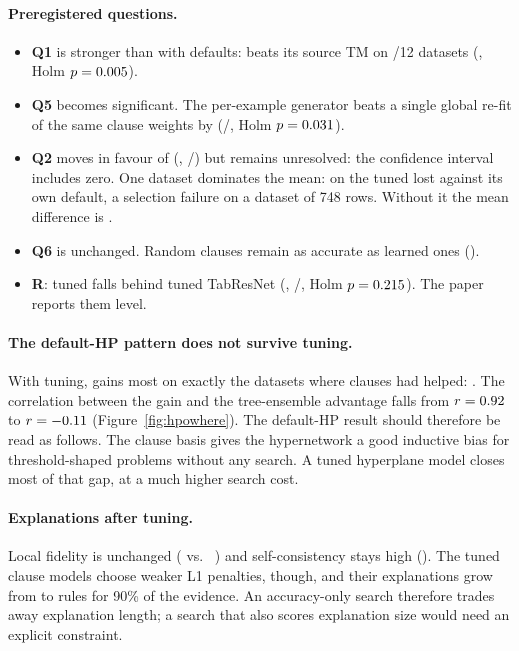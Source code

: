 \paragraph{Preregistered questions.}
\begin{itemize}
  \item \textbf{Q1} is stronger than with defaults:  beats its source TM on
        \HpoimntmtmWins/12 datasets (\HpoimntmtmMean, Holm $p=0.005$).
  \item \textbf{Q5} becomes significant. The per-example generator beats a single global re-fit
        of the same clause weights by \HpoimntmclauselrMean{}
        (\HpoimntmclauselrWins/\HpoimntmclauselrLosses, Holm $p=0.031$).
  \item \textbf{Q2} moves in favour of  (\HpoimntmimnMean,
        \HpoimntmimnWins/\HpoimntmimnLosses) but remains unresolved: the confidence interval
        includes zero. One dataset dominates the mean: on \HpoImntmImnBest{} the tuned \imn{}
        lost \TuneimnWorst{} against its own default, a selection failure on a dataset of
        748 rows. Without it the mean difference is \HpoImntmImnMeanNoBest.
  \item \textbf{Q6} is unchanged. Random clauses remain as accurate as learned ones
        (\HpoimntmimntmrandMean).
  \item \textbf{R}: tuned \imn{} falls behind tuned TabResNet (\HpoimntabresnetMean,
        \HpoimntabresnetWins/\HpoimntabresnetLosses, Holm $p=0.215$). The paper
        reports them level.
\end{itemize}

\paragraph{The default-HP pattern does not survive tuning.} With tuning, \imn{} gains most on
exactly the datasets where clauses had helped: \TuneimnBest. The correlation between the
 gain and the tree-ensemble advantage falls from $r=0.92$ to
$r=-0.11$ (Figure~\ref{fig:hpowhere}). The default-HP result should therefore be read as
follows. The clause basis gives the hypernetwork a good inductive bias for threshold-shaped
problems without any search. A tuned hyperplane model closes most of that gap, at a much higher
search cost.

\paragraph{Explanations after tuning.} Local fidelity is unchanged (
\HpoFidimntm{} vs.\ \imn{} \HpoFidimn) and self-consistency stays high (\HpoSelfimntm). The tuned
clause models choose weaker L1 penalties, though, and their explanations grow from
\MainClausesimntm{} to \HpoClausesimntm{} rules for 90\% of the evidence. An accuracy-only
search therefore trades away explanation length; a search that also scores explanation size
would need an explicit constraint.

